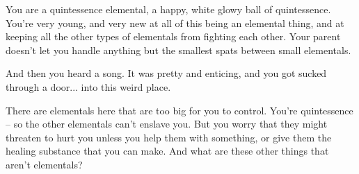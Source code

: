 \documentclass[char]{elementals}
\begin{document}
\name{\cNewQ{}}

You are a quintessence elemental, a happy, white glowy ball of quintessence.  You're very young, and very new at all of this being an elemental thing, and at keeping all the other types of elementals from fighting each other.  Your parent doesn't let you handle anything but the smallest spats between small elementals.

And then you heard a song.  It was pretty and enticing, and you got sucked through a door... into this weird place.

There are elementals here that are too big for you to control.  You're quintessence -- so the other elementals can't enslave you.  But you worry that they might threaten to hurt you unless you help them with something, or give them the healing substance \iWhite{} that you can make.  And what are these other things that aren't elementals?
\end{document}
